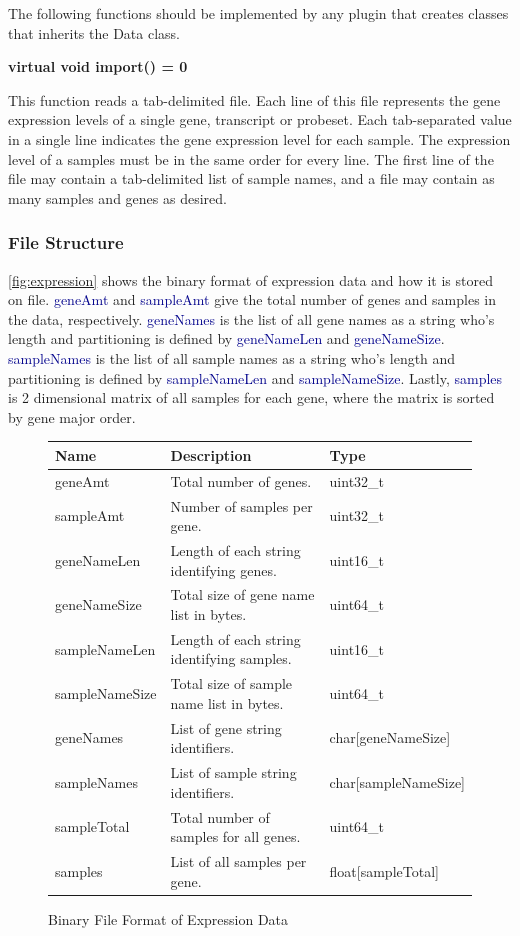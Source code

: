 \documentclass[10pt]{article}
\providecommand{\h}[1]{\textcolor{darkblue}{#1}}
\begin{document}
The following functions should be implemented by any plugin that creates
classes that inherits the Data class.

{\bfseries virtual void import() = 0}

This function reads a tab-delimited file.  Each line of this file
represents the gene expression levels of a single gene, transcript or probeset.
Each tab-separated value in a single line indicates the gene expression level 
for each sample. The expression level of a samples must be in the same 
order for every line.  The first line of the file may contain a tab-delimited
list of sample names, and a file may contain as many samples and genes as
desired.

\subsubsection{File Structure}

\autoref{fig:expression} shows the binary format of expression data and how it 
is stored on file. \h{geneAmt} and \h{sampleAmt} give the total number of genes 
and samples in the data, respectively. \h{geneNames} is the list of all gene 
names as a string who's length and partitioning is defined by \h{geneNameLen} 
and \h{geneNameSize}. \h{sampleNames} is the list of all sample names as a 
string who's length and partitioning is defined by \h{sampleNameLen} and 
\h{sampleNameSize}. Lastly, \h{samples} is 2 dimensional matrix of all samples 
for each gene, where the matrix is sorted by gene major order.

\begin{figure}[H]
\begin{mdframed}[style=btable]
\begin{tabularx}{\textwidth}{|l|X|l|}
\hline
\textbf{Name} & \textbf{Description} & \textbf{Type} \\
\hline
geneAmt & Total number of genes. & uint32\_t \\
\hline
sampleAmt & Number of samples per gene. & uint32\_t \\
\hline
geneNameLen & Length of each string identifying genes. & uint16\_t \\
\hline
geneNameSize & Total size of gene name list in bytes. & uint64\_t \\
\hline
sampleNameLen & Length of each string identifying samples. & uint16\_t \\
\hline
sampleNameSize & Total size of sample name list in bytes. & uint64\_t \\
\hline
geneNames & List of gene string identifiers. & char[geneNameSize] \\
\hline
sampleNames & List of sample string identifiers. & char[sampleNameSize] \\
\hline
sampleTotal & Total number of samples for all genes. & uint64\_t \\
\hline
samples & List of all samples per gene. & float[sampleTotal] \\
\hline
\end{tabularx}
\end{mdframed}
\caption{Binary File Format of Expression Data}
\label{fig:expression}
\end{figure}
\end{document}
